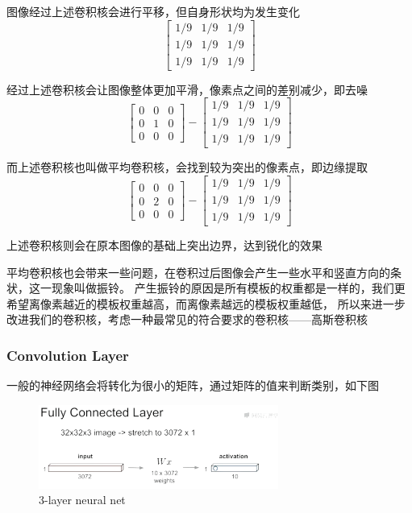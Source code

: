 \documentclass[12pt]{article}
\begin{document}
图像经过上述卷积核会进行平移，但自身形状均为发生变化
\[
\begin{bmatrix}
1/9 & 1/9 & 1/9\\
1/9 & 1/9 & 1/9\\
1/9 & 1/9 & 1/9
\end{bmatrix}
\]

经过上述卷积核会让图像整体更加平滑，像素点之间的差别减少，即去噪
\[
\begin{bmatrix}
0 & 0 & 0\\
0 & 1 & 0\\
0 & 0 & 0
\end{bmatrix}
-
\begin{bmatrix}
1/9 & 1/9 & 1/9\\
1/9 & 1/9 & 1/9\\
1/9 & 1/9 & 1/9
\end{bmatrix}
\]

而上述卷积核也叫做平均卷积核，会找到较为突出的像素点，即边缘提取
\[
\begin{bmatrix}
0 & 0 & 0\\
0 & 2 & 0\\
0 & 0 & 0
\end{bmatrix}
-
\begin{bmatrix}
1/9 & 1/9 & 1/9\\
1/9 & 1/9 & 1/9\\
1/9 & 1/9 & 1/9
\end{bmatrix}
\]

上述卷积核则会在原本图像的基础上突出边界，达到锐化的效果

平均卷积核也会带来一些问题，在卷积过后图像会产生一些水平和竖直方向的条状，这一现象叫做振铃。
产生振铃的原因是所有模板的权重都是一样的，我们更希望离像素越近的模板权重越高，而离像素越远的模板权重越低，
所以来进一步改进我们的卷积核，考虑一种最常见的符合要求的卷积核——高斯卷积核
\subsubsection{Convolution Layer}
一般的神经网络会将转化为很小的矩阵，通过矩阵的值来判断类别，如下图
\begin{figure}[ht]  %
\centering
\includegraphics[width=0.7\textwidth]{pic10.png}
\caption{3-layer neural net}
\end{figure}
\end{document}
